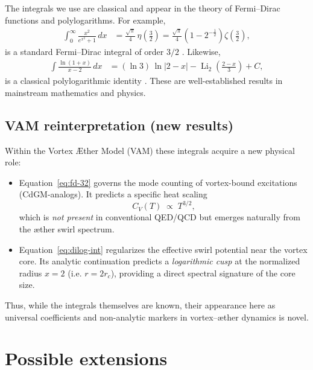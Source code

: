 \documentclass[12pt]{article}
\begin{document}
    The integrals we use are classical and appear in the theory of Fermi--Dirac functions
    and polylogarithms. For example,
    \begin{align}
        \int_{0}^{\infty}\frac{x^{2}}{e^{x^{2}}+1}\,dx
        &= \frac{\sqrt{\pi}}{4}\,\eta\!\left(\tfrac{3}{2}\right)
        = \frac{\sqrt{\pi}}{4}\!\left(1-2^{-\tfrac{1}{2}}\right)\zeta\!\left(\tfrac{3}{2}\right),
        \label{eq:fd-32}
    \end{align}
    is a standard Fermi--Dirac integral of order $3/2$ \cite{PathriaBeale2021,AbramowitzStegun1964}.
    Likewise,
    \begin{align}
        \int \frac{\ln(1+x)}{x-2}\,dx
        &= (\ln 3)\,\ln|2-x| - \operatorname{Li}_{2}\!\left(\tfrac{2-x}{3}\right) + C ,
        \label{eq:dilog-int}
    \end{align}
    is a classical polylogarithmic identity \cite{Lewin1981}.
    These are well-established results in mainstream mathematics and physics.

    \subsection*{VAM reinterpretation (new results)}

    Within the Vortex \AE ther Model (VAM) these integrals acquire a new physical role:

    \begin{itemize}
        \item Equation~\eqref{eq:fd-32} governs the mode counting of vortex-bound
        excitations (CdGM-analogs). It predicts a specific heat scaling
        \[
            C_V(T)\;\propto\;T^{3/2},
        \]
        which is \emph{not present} in conventional QED/QCD but emerges naturally
        from the æther swirl spectrum.

        \item Equation~\eqref{eq:dilog-int} regularizes the effective
        swirl potential near the vortex core. Its analytic continuation
        predicts a \emph{logarithmic cusp} at the normalized radius $x=2$
        (i.e. $r=2r_c$), providing a direct spectral signature of the core size.
    \end{itemize}

    Thus, while the integrals themselves are known, their appearance here
    as universal coefficients and non-analytic markers in vortex–æther
    dynamics is novel.

    \section{Possible extensions}
\end{document}
